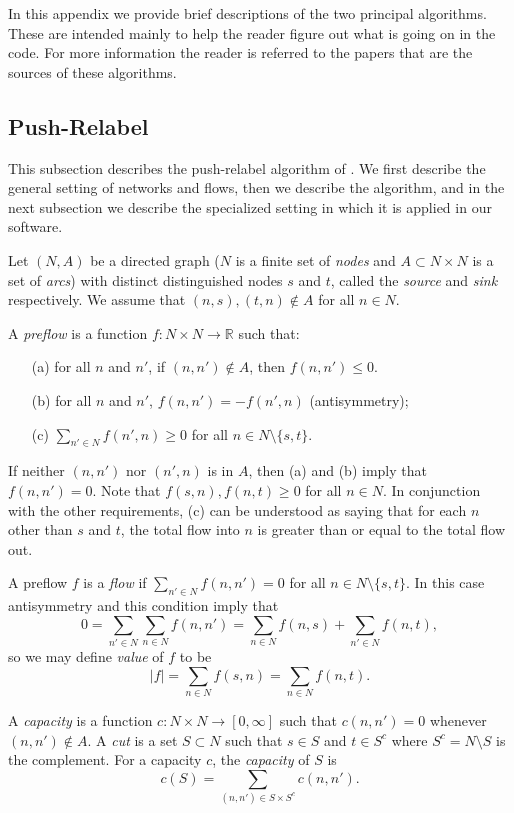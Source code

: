 \documentclass[12pt]{article}
\theoremstyle{definition}
\renewcommand{\Re}{\mathbb{R}}
\begin{document}
\begin{appendix}
In this appendix we provide brief descriptions of the two principal
algorithms.  These are intended mainly to help the reader figure out
what is going on in the code.  For more information the reader is
referred to the papers that are the sources of these algorithms.

\subsection{Push-Relabel}

This subsection describes the push-relabel algorithm of \cite{GoTa88}.
We first describe the general setting of networks and flows, then we
describe the algorithm, and in the next subsection we describe the
specialized setting in which it is applied in our software.

Let $(N,A)$ be a directed graph ($N$ is a finite set of \emph{nodes}
and $A \subset N \times N$ is a set of \emph{arcs}) with distinct
distinguished nodes $s$ and $t$, called the \emph{source} and
\emph{sink} respectively.  We assume that $(n,s), (t, n) \notin A$ for
all $n \in N$.

A \emph{preflow} is a function $f \colon N \times N \to \Re$ such that:
\begin{enumerate}
  \item[(a)] for all $n$ and $n'$,  if $(n,n') \notin A$, then $f(n,n') \le 0$.
  \item[(b)] for all $n$ and $n'$,  $f(n,n') = - f(n',n)$ (antisymmetry); 
  \item[(c)] $\sum_{n' \in N} f(n',n) \ge 0$ for all $n \in N \setminus \{s,t\}$. 
\end{enumerate}
If neither $(n,n')$ nor $(n',n)$ is in $A$, then (a) and (b) imply
that $f(n,n') = 0$.  Note that $f(s,n), f(n,t) \ge 0$ for all $n \in
N$.  In conjunction with the other requirements, (c) can be understood
as saying that for each $n$ other than $s$ and $t$, the total flow
into $n$ is greater than or equal to the total flow out.

A preflow $f$ is a \emph{flow} if $\sum_{n' \in N} f(n,n') = 0$ for
all $n \in N \setminus \{s,t\}$.  In this case antisymmetry and this
condition imply that
$$0 = \sum_{n' \in N}\sum_{n \in N} f(n,n') = \sum_{n \in N} f(n,s) + \sum_{n' \in N} f(n,t),$$
so we may define \emph{value} of $f$ to be
$$|f| = \sum_{n \in N} f(s,n) = \sum_{n \in N} f(n,t).$$

A \emph{capacity} is a function $c \colon N \times N \to [0,\infty]$
such that $c(n,n') = 0$ whenever $(n,n') \notin A$.  A \emph{cut} is a
set $S \subset N$ such that $s \in S$ and $t \in S^c$ where $S^c = N
\setminus S$ is the complement.  For a capacity $c$, the
\emph{capacity} of $S$ is
$$c(S) = \sum_{(n,n') \in S \times S^c} c(n,n').$$


\end{appendix}
\end{document}

